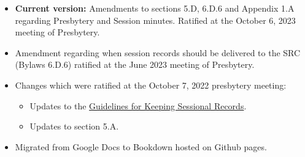 \documentclass[
]{book}
\providecommand{\tightlist}{%
  \setlength{\itemsep}{0pt}\setlength{\parskip}{0pt}}
\begin{document}
\begin{itemize}
\tightlist
\item
  \textbf{Current version:} Amendments to sections 5.D, 6.D.6 and Appendix 1.A regarding Presbytery and Session minutes. Ratified at the October 6, 2023 meeting of Presbytery.
\item
  Amendment regarding when session records should be delivered to the SRC (Bylaws 6.D.6) ratified at the June 2023 meeting of Presbytery.
\item
  Changes which were ratified at the October 7, 2022 presbytery meeting:

  \begin{itemize}
  \tightlist
  \item
    Updates to the \href{https://bylaws.evangelpresbytery.com/bylaws.html\#appendix-1-guidelines-for-keeping-sessional-records}{Guidelines for Keeping Sessional Records}.
  \item
    Updates to section 5.A.
  \end{itemize}
\item
  Migrated from Google Docs to Bookdown hosted on Github pages.
\end{itemize}
\end{document}
